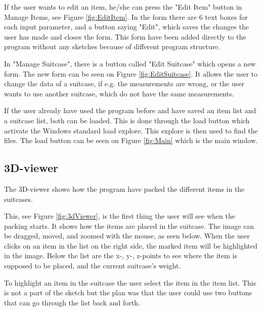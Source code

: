 If the user wants to edit an item, he/she can press the "Edit Item" button in Manage Items, see Figure \ref{fig:EditItem}. In the form there are 6 text boxes for each input parameter, and a button saying "Edit", which saves the changes the user has made and closes the form. This form have been added directly to the program without any sketches because of different program structure.

In "Manage Suitcase", there is a button called "Edit Suitcase" which opens a new form. The new form can be seen on Figure \ref{fig:EditSuitcase}. It allows the user to change the data of a suitcase, if e.g. the measurements are wrong, or the user wants to use another suitcase, which do not have the same measurements.

If the user already have used the program before and have saved an item list and a suitcase list, both can be loaded. This is done through the load button which activate the Windows standard load explore. This explore is then used to find the files. The load button can be seen on Figure \ref{fig:Main} which is the main window.

\subsection{3D-viewer}
The 3D-viewer shows how the program have packed the different items in the suitcases.


This, see Figure \ref{fig:3dViewer}, is the first thing the user will see when the packing starts. It shows how the items are placed in the suitcase.
The image can be dragged, moved, and zoomed with the mouse, as seen below. When the user clicks on an item in the list on the right side, the marked item will be highlighted in the image. Below the list are the x-, y-, z-points to see where the item is supposed to be placed, and the current suitcase's weight.

To highlight an item in the suitcase the user select the item in the item list. This is not a part of the sketch but the plan was that the user could use two buttons that can go through the list back and forth.

